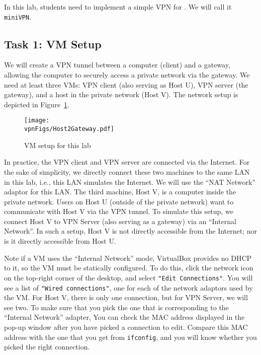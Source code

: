 In this lab, students need to implement a simple VPN for \linux. We will
call it {\tt miniVPN}. 




\subsection{Task 1: VM Setup}

We will create a VPN tunnel between a 
computer (client) and a gateway, allowing the computer to securely access 
a private network via the gateway. 
We need at least three VMs: VPN client (also serving as Host U), VPN server (the gateway),
and a host in the private network (Host V). 
The network setup is depicted in Figure~\ref{vpn:fig:host2gateway}.


\begin{figure}[htb]
\begin{center}
\texttt{[image: \\vpnFigs/Host2Gateway.pdf]}
\end{center}
\caption{VM setup for this lab}
\label{vpn:fig:host2gateway}
\end{figure}
 


In practice, the VPN client and VPN server are connected via the Internet.
For the sake of simplicity, we directly connect these two
machines to the same LAN in this lab, i.e., this LAN simulates the Internet. 
We will use the ``NAT Network'' adaptor for this LAN.
The third machine, Host V, is a computer inside the private network. Users
on Host U (outside of the private network) want to communicate with Host V
via the VPN tunnel. To simulate this setup, we connect Host V to VPN Server
(also serving as a gateway) via an ``Internal Network''.  In such a setup, 
Host V is not directly accessible from the Internet; nor is it directly accessible 
from Host U. 

Note if a VM uses the ``Internal Network'' mode, VirtualBox provides no DHCP to it, so the
VM must be statically configured. To do this, click the network icon on the top-right corner
of the desktop, and select \texttt{"Edit Connections"}. You will see a list 
of \texttt{"Wired connections"}, one for each of the network adaptors used by the VM. 
For Host V, there is only one connection, but for VPN Server, we will see two. To make sure 
that you pick the one that is corresponding to the ``Internal Network'' adapter, 
You can check the MAC address displayed in the pop-up window after you have 
picked a connection to edit. 
Compare this MAC address with the one that you get from \texttt{ifconfig},
and you will know whether you picked the right connection. 

